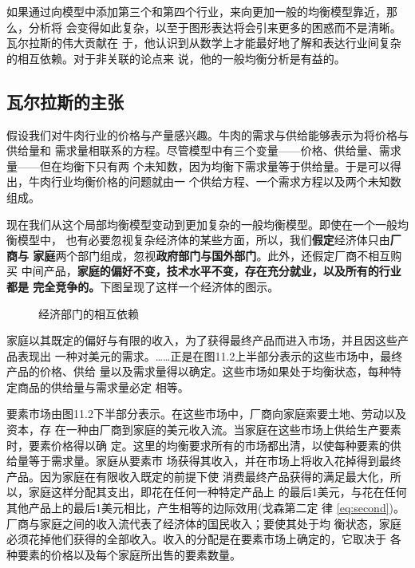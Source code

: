如果通过向模型中添加第三个和第四个行业，来向更加一般的均衡模型靠近，那么，分析将
会变得如此复杂，以至于图形表达将会引来更多的困惑而不是清晰。瓦尔拉斯的伟大贡献在
于，他认识到从数学上才能最好地了解和表达行业间复杂的相互依赖。对于非关联的论点来
说，他的一般均衡分析是有益的。

\subsection{瓦尔拉斯的主张}

假设我们对牛肉行业的价格与产量感兴趣。牛肉的需求与供给能够表示为将价格与供给量和
需求量相联系的方程。尽管模型中有三个变量——价格、供给量、需求量——但在均衡下只有两
个未知数，因为均衡下需求量等于供给量。于是可以得出，牛肉行业均衡价格的问题就由一
个供给方程、一个需求方程以及两个未知数组成。

现在我们从这个局部均衡模型变动到更加复杂的一般均衡模型。即使在一个一般均衡模型中，
也有必要忽视复杂经济体的某些方面，所以，我们\textbf{假定}经济体只由\textbf{厂商与
  家庭}两个部门组成，忽视\textbf{政府部门与国外部门}。此外，还假定厂商不相互购买
中间产品，\textbf{家庭的偏好不变，技术水平不变，存在充分就业，以及所有的行业都是
  完全竞争的。}下图呈现了这样一个经济体的图示。
\begin{figure}[ht]
  \centering
  \caption{\label{fig:interdepend}经济部门的相互依赖}
\end{figure}

家庭以其既定的偏好与有限的收入，为了获得最终产品而进入市场，并且因这些产品表现出
一种对美元的需求。……正是在图11.2上半部分表示的这些市场中，最终产品的价格、供给
量以及需求量得以确定。这些市场如果处于均衡状态，每种特定商品的供给量与需求量必定
相等。

要素市场由图11.2下半部分表示。在这些市场中，厂商向家庭索要土地、劳动以及资本，存
在一种由厂商到家庭的美元收入流。当家庭在这些市场上供给生产要素时，要素价格得以确
定。这里的均衡要求所有的市场都出清，以使每种要素的供给量等于需求量。家庭从要素市
场获得其收入，并在市场上将收入花掉得到最终产品。因为家庭在有限收入既定的前提下使
消费最终产品获得的满足最大化，所以，家庭这样分配其支出，即花在任何一种特定产品上
的最后1美元，与花在任何其他产品上的最后1美元相比，产生相等的边际效用(戈森第二定
律 \cref{eq:second})。厂商与家庭之间的收入流代表了经济体的国民收入；要使其处于均
衡状态，家庭必须花掉他们获得的全部收入。收入的分配是在要素市场上确定的，它取决于
各种要素的价格以及每个家庭所出售的要素数量。

